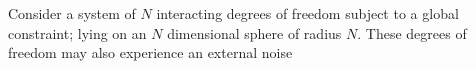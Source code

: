 Consider a system of $N$ interacting degrees of freedom subject to a global constraint; lying on an $N$ dimensional sphere of radius $N$. These degrees of freedom may also experience an external noise $$